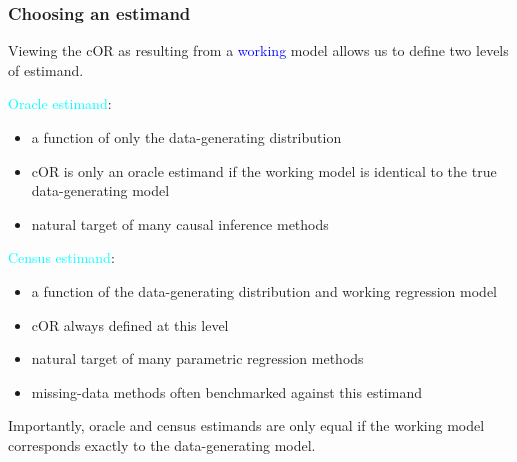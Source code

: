 \documentclass[10pt, table]{beamer}
\begin{document}
\begin{frame} \frametitle{Choosing an estimand}

Viewing the cOR as resulting from a \textcolor{blue}{working} model allows us to define two levels of estimand.

\textcolor{cyan}{Oracle estimand}:\vspace{-0.4cm}
\begin{itemize}
  \item a function of only the data-generating distribution
  \item cOR is only an oracle estimand if the working model is identical to the true data-generating model
  \item natural target of many causal inference methods
\end{itemize} \pause

\textcolor{cyan}{Census estimand}:\vspace{-0.4cm}
\begin{itemize}
  \item a function of the data-generating distribution and working regression model
  \item cOR always defined at this level
  \item natural target of many parametric regression methods
  \item missing-data methods often benchmarked against this estimand
\end{itemize}

Importantly, oracle and census estimands are only equal if the working model corresponds exactly to the data-generating model.

\end{frame}
\end{document}
